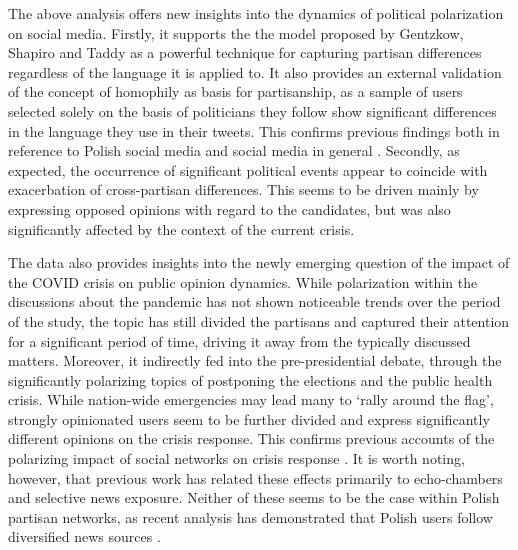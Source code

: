 \documentclass{article}
\begin{document}
	The above analysis offers new insights into the dynamics of political polarization on social media. Firstly, it supports the the model proposed by Gentzkow, Shapiro and Taddy as a powerful technique for capturing partisan differences regardless of the language it is applied to. It also provides an external validation of the concept of homophily as basis for partisanship, as a sample of users selected solely on the basis of politicians they follow show significant differences in the language they use in their tweets. This confirms previous findings both in reference to Polish social media \citep{matuszewski2018, matuszewski2019} and social media in general \citep{volkova2014, demszky2019} . Secondly, as expected, the occurrence of significant political events appear to coincide with exacerbation of cross-partisan differences. This seems to be driven mainly by expressing opposed opinions with regard to the candidates, but was also significantly affected by the context of the current crisis. 
	
	The data also provides insights into the newly emerging question of the impact of the COVID crisis on public opinion dynamics. While polarization within the discussions about the pandemic has not shown noticeable trends over the period of the study, the topic has still divided the partisans and captured their attention for a significant period of time, driving it away from the typically discussed matters. Moreover, it indirectly fed into the pre-presidential debate, through the significantly polarizing topics of postponing the elections and the public health crisis. While nation-wide emergencies may lead many to ‘rally around the flag’, strongly opinionated users seem to be further divided and express significantly different opinions on the crisis response. This confirms previous accounts of the polarizing impact of social networks on crisis response \citep{elmedni2016, jacobson2010}. It is worth noting, however, that previous work has related these effects primarily to echo-chambers and selective news exposure. Neither of these seems to be the case within Polish partisan networks, as recent analysis has demonstrated that Polish users follow diversified news sources \citep{matuszewski2018}.
	
\end{document}
